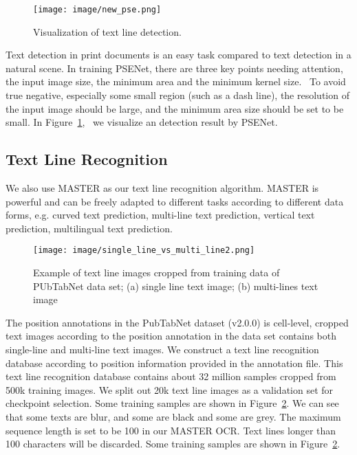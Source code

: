 \documentclass{article}
\begin{document}
\begin{figure}[h] \centering
    \texttt{[image: image/new\_pse.png]}
    \caption{Visualization of text line detection.}
    \label{fig:PSENetTextLineDetection}
\end{figure}

Text detection in print documents is an easy task compared to text detection in a natural scene. In training PSENet, there are three key points needing attention, the input image size, the minimum area and the minimum kernel size.  To avoid true negative, especially some small region (such as a dash line), the resolution of the input image should be large, and the minimum area size should be set to be small. In Figure~\ref{fig:PSENetTextLineDetection},  we visualize an detection result by PSENet.











\subsection{Text Line Recognition}
We also use MASTER as our text line recognition algorithm. MASTER is powerful and can be freely adapted to different tasks according to different data forms, e.g. curved text prediction, multi-line text prediction, vertical text prediction, multilingual text prediction.







\begin{figure}[h] \centering
    \texttt{[image: image/single\_line\_vs\_multi\_line2.png]}
    \caption{Example of text line images cropped from training data of PUbTabNet data set; (a) single line text image; (b) multi-lines text image}
    \label{fig:ocrtrainingsamples}
\end{figure}

The position annotations in the PubTabNet dataset (v2.0.0) is cell-level, cropped text images according to the position annotation in the data set contains both single-line and multi-line text images.
We construct a text line recognition database according to position information provided in the annotation file. This text line recognition database contains about 32 million samples cropped from 500k training images. We split out 20k text line images as a validation set for checkpoint selection. Some training samples are shown in Figure~\ref{fig:ocrtrainingsamples}. We can see that some texts are blur, and some are black and some are grey.
The maximum sequence length is set to be 100 in our MASTER OCR. Text lines longer than 100 characters will be discarded. Some training samples are shown in Figure~\ref{fig:ocrtrainingsamples}.
\end{document}
